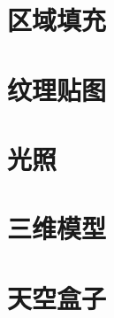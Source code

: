     \section{区域填充}

    \section{纹理贴图}
    
    \section{光照}
    
    \section{三维模型}
    
    \section{天空盒子}

